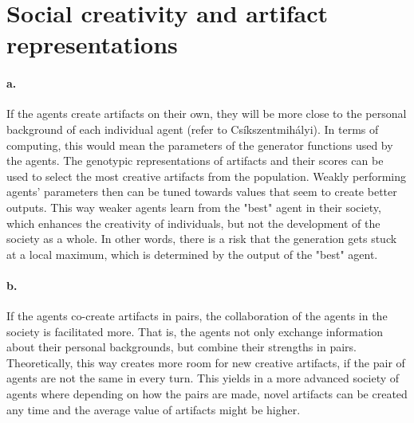 \documentclass[english]{tktltiki}
\begin{document}
    \section{Social creativity and artifact representations}
    
    \paragraph{a.} If the agents create artifacts on their own, they will be more close to the personal background of each individual agent (refer to Cs\'ikszentmih\'alyi). In terms of computing, this would mean the parameters of the generator functions used by the agents. The genotypic representations of artifacts and their scores can be used to select the most creative artifacts from the population. Weakly performing agents' parameters then can be tuned towards values that seem to create better outputs. This way weaker agents learn from the "best" agent in their society, which enhances the creativity of individuals, but not the development of the society as a whole. In other words, there is a risk that the generation gets stuck at a local maximum, which is determined by the output of the "best" agent.

    \paragraph{b.} If the agents co-create artifacts in pairs, the collaboration of the agents in the society is facilitated more. That is, the agents not only exchange information about their personal backgrounds, but combine their strengths in pairs. Theoretically, this way creates more room for new creative artifacts, if the pair of agents are not the same in every turn. This yields in a more advanced society of agents where depending on how the pairs are made, novel artifacts can be created any time and the average value of artifacts might be higher. 
    
    
\end{document}

